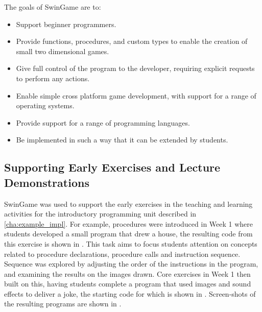The goals of SwinGame are to:
\begin{itemize}[noitemsep, nolistsep]
   \item Support beginner programmers.
   \item Provide functions, procedures, and custom types to enable the creation of small two dimensional games.
   \item Give full control of the program to the developer, requiring explicit requests to perform any actions.
   \item Enable simple cross platform game development, with support for a range of operating systems.
   \item Provide support for a range of programming languages.
   \item Be implemented in such a way that it can be extended by students.
\end{itemize} 


\subsection{Supporting Early Exercises and Lecture Demonstrations} %
\label{sub:supporting_early_exercises}

SwinGame was used to support the early exercises in the teaching and learning activities for the introductory programming unit described in \cref{cha:example_impl}. For example, procedures were introduced in Week 1 where students developed a small program that drew a house, the resulting code from this exercise is shown in . This task aims to focus students attention on concepts related to procedure declarations, procedure calls and instruction sequence. Sequence was explored by adjusting the order of the instructions in the program, and examining the results on the images drawn. Core exercises in Week 1 then built on this, having students complete a program that used images and sound effects to deliver a joke, the starting code for which is shown in . Screen-shots of the resulting programs are shown in .



